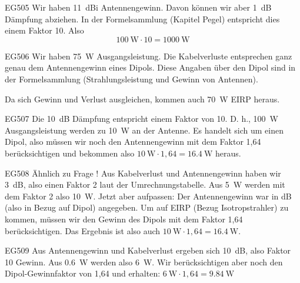 \begin{sol}{EG505}
    Wir haben \SI{11}{dBi} Antennengewinn. Davon können wir aber \SI{1}{\dB} Dämpfung abziehen. In der Formelsammlung (Kapitel Pegel) entspricht dies einem Faktor 10.
    Also $$ \SI{100}{\watt} \cdot 10 = \SI{1000}{\watt} $$

\end{sol}

\begin{sol}{EG506}
Wir haben \SI{75}{\watt} Ausgangsleistung. 
Die Kabelverluste entsprechen ganz genau dem Antennengewinn eines Dipols.
Diese Angaben über den Dipol sind in der Formelsammlung (Strahlungsleistung und Gewinn von Antennen).

Da sich Gewinn und Verlust ausgleichen, kommen auch \SI{70}{\watt} EIRP heraus.
\end{sol}

\begin{sol}{EG507}
 Die \SI{10}{\dB} Dämpfung entspricht einem Faktor von 10. D. h., \SI{100}{\watt} Ausgangsleistung werden zu \SI{10}{\watt} an der Antenne. Es handelt sich um einen Dipol, also müssen wir noch den Antennengewinn mit dem Faktor 1,64 berücksichtigen und bekommen also $\SI{10}{\watt} \cdot 1,64 = \SI{16,4}{\watt}$ heraus.
\end{sol}

\begin{sol}{EG508}
    Ähnlich zu Frage !
    Aus Kabelverlust und Antennengewinn haben wir \SI{3}{\dB}, also einen Faktor 2 laut der Umrechnungstabelle. Aus \SI{5}{\watt} werden mit dem Faktor 2 also \SI{10}{\watt}.
    Jetzt aber aufpassen: Der Antennengewinn war in dB (also in Bezug auf Dipol) angegeben. Um auf EIRP (Bezug Isotropstrahler) zu kommen, müssen wir den Gewinn des Dipols mit dem Faktor 1,64 berücksichtigen. Das Ergebnis ist also auch $\SI{10}{\watt} \cdot 1,64 = \SI{16,4}{\watt}$.
\end{sol}

\begin{sol}{EG509}
    Aus Antennengewinn und Kabelverlust ergeben sich \SI{10}{\dB}, also Faktor 10 Gewinn. Aus \SI{0,6}{\watt} werden also \SI{6}{\watt}. Wir berücksichtigen aber noch den Dipol-Gewinnfaktor von 1,64 und erhalten: $\SI{6}{\watt} \cdot 1,64 = \SI{9,84}{\watt}$
\end{sol}

